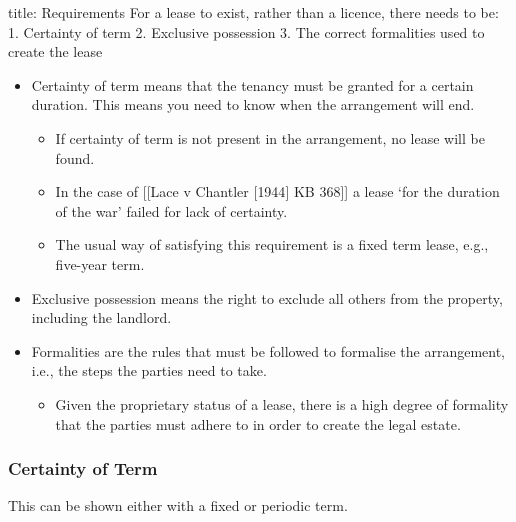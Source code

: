\documentclass[
]{article}
\newenvironment{Shaded}{}{}
\newcommand{\NormalTok}[1]{#1}
\providecommand{\tightlist}{%
  \setlength{\itemsep}{0pt}\setlength{\parskip}{0pt}}
\begin{document}
\begin{Shaded}
\begin{Highlighting}[]
\NormalTok{title: Requirements}
\NormalTok{For a lease to exist, rather than a licence, there needs to be:}
\NormalTok{1. Certainty of term}
\NormalTok{2. Exclusive possession}
\NormalTok{3. The correct formalities used to create the lease}
\end{Highlighting}
\end{Shaded}

\begin{itemize}
\tightlist
\item
  Certainty of term means that the tenancy must be granted for a certain
  duration. This means you need to know when the arrangement will end.

  \begin{itemize}
  \tightlist
  \item
    If certainty of term is not present in the arrangement, no lease
    will be found.
  \item
    In the case of {[}{[}Lace v Chantler {[}1944{]} KB 368{]}{]} a lease
    `for the duration of the war' failed for lack of certainty.
  \item
    The usual way of satisfying this requirement is a fixed term lease,
    e.g., five-year term.
  \end{itemize}
\item
  Exclusive possession means the right to exclude all others from the
  property, including the landlord.
\item
  Formalities are the rules that must be followed to formalise the
  arrangement, i.e., the steps the parties need to take.

  \begin{itemize}
  \tightlist
  \item
    Given the proprietary status of a lease, there is a high degree of
    formality that the parties must adhere to in order to create the
    legal estate.
  \end{itemize}
\end{itemize}

\hypertarget{certainty-of-term}{%
\subsubsection{Certainty of Term}\label{certainty-of-term}}

This can be shown either with a fixed or periodic term.
\end{document}
